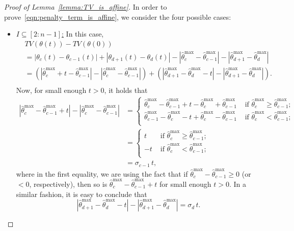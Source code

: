 \documentclass[11pt]{article}
\theoremstyle{plain}
\theoremstyle{definition}
\theoremstyle{remark}
\begin{document}
\begin{appendix}
\begin{proof}[Proof of Lemma~\ref{lemma:TV_is_affine}]
In order to prove~\eqref{eqn:penalty_term_is_affine}, we consider the four possible cases:
\begin{itemize}
    \item \underline{$I\subseteq [2:n-1]$:} In this case, 
    \begin{align*}
        &TV(\theta(t))-TV(\theta(0))\\
        &=|\theta_c(t)-\theta_{c-1}(t)|+|\theta_{d+1}(t)-\theta_d(t)|-|\hat{\theta}^{\max}_c-\hat{\theta}^{\max}_{c-1}|-|\hat{\theta}^{\max}_{d+1}-\hat{\theta}^{\max}_d|\\
        &=\left(|\hat\theta^{\max}_c+t-\hat\theta^{\max}_{c-1}|-|\hat{\theta}^{\max}_c-\hat{\theta}^{\max}_{c-1}|\right)+\left(|\hat\theta^{\max}_{d+1}-\hat\theta^{\max}_d-t|-|\hat{\theta}^{\max}_{d+1}-\hat{\theta}^{\max}_d|\right).\\
    \end{align*}
    Now, for small enough $t>0$, it holds that
    \begin{align*}
        |\hat\theta^{\max}_c-\hat\theta^{\max}_{c-1}+t|-|\hat{\theta}^{\max}_c-\hat{\theta}^{\max}_{c-1}|&=\begin{cases}
            \hat\theta^{\max}_c-\hat\theta^{\max}_{c-1}+t-\hat{\theta}^{\max}_c+\hat{\theta}^{\max}_{c-1} & \text{ if }  \hat\theta^{\max}_c\geq \hat\theta^{\max}_{c-1};\\
            \hat\theta^{\max}_{c-1}-\hat\theta^{\max}_c-t+\hat{\theta}^{\max}_c-\hat{\theta}^{\max}_{c-1} & \text{ if }  \hat\theta^{\max}_c< \hat\theta^{\max}_{c-1};\\
        \end{cases}\\
        &=\begin{cases}
            t & \text{ if }  \hat\theta^{\max}_c\geq \hat\theta^{\max}_{c-1};\\
            -t & \text{ if }  \hat\theta^{\max}_c< \hat\theta^{\max}_{c-1};\\
        \end{cases}\\\
        &=\sigma_{c-1}\,t,
    \end{align*}
    where in the first equality, we are using the fact that if $\hat\theta^{\max}_c-\hat\theta^{\max}_{c-1}\geq 0$ (or $<0$, respectively), then so is $\hat\theta^{\max}_c-\hat\theta^{\max}_{c-1}+t$ for small enough $t>0$.
    In a similar fashion, it is easy to conclude that 
    \[|\hat\theta^{\max}_{d+1}-\hat\theta^{\max}_d-t|-|\hat{\theta}^{\max}_{d+1}-\hat{\theta}^{\max}_d|=\sigma_d\,t.\]

\end{itemize}
\end{proof}
\end{appendix}
\end{document}
